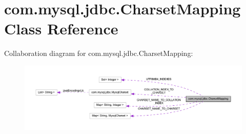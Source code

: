 \hypertarget{classcom_1_1mysql_1_1jdbc_1_1_charset_mapping}{}\section{com.\+mysql.\+jdbc.\+Charset\+Mapping Class Reference}
\label{classcom_1_1mysql_1_1jdbc_1_1_charset_mapping}


Collaboration diagram for com.\+mysql.\+jdbc.\+Charset\+Mapping\+:\nopagebreak
\begin{figure}[H]
\begin{center}
\leavevmode
\includegraphics[width=350pt]{classcom_1_1mysql_1_1jdbc_1_1_charset_mapping__coll__graph}
\end{center}
\end{figure}
